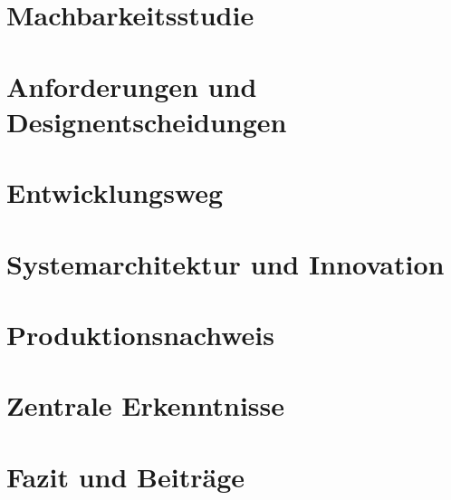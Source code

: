 \documentclass[
paper=A4,        
fontsize=12,        
DIV=11,           
parskip=half,    
headsepline,   
numbers=noenddot  
]{scrartcl}					%
\begin{document}
    \newpage

    \section{Machbarkeitsstudie}\label{sec:feasibility}


    \newpage

    \section{Anforderungen und Designentscheidungen}\label{sec:requirements}

    \newpage

    \section{Entwicklungsweg}\label{sec:development}

    \newpage

    \section{Systemarchitektur und Innovation}\label{sec:system}


    \newpage

    \section{Produktionsnachweis}\label{sec:showcase}


    \newpage

    \section{Zentrale Erkenntnisse}\label{sec:insights}
        

    \newpage

    \section{Fazit und Beiträge}\label{sec:conclusions}
        
\end{document}
